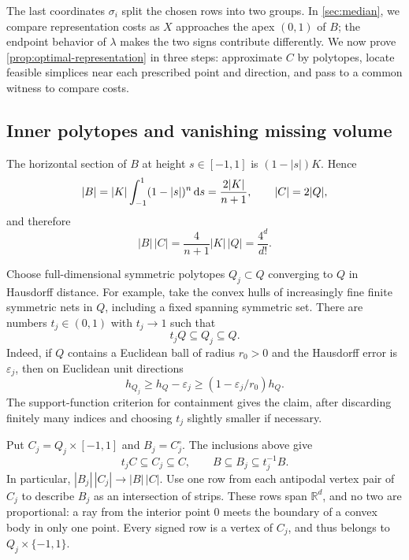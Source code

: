 The last coordinates $\sigma_i$ split the chosen rows into two groups. In \cref{sec:median}, we compare representation costs as $X$ approaches the apex $(0,1)$ of $B$; the endpoint behavior of $\lambda$ makes the two signs contribute differently. We now prove \cref{prop:optimal-representation} in three steps: approximate $C$ by polytopes, locate feasible simplices near each prescribed point and direction, and pass to a common witness to compare costs.

\subsection{Inner polytopes and vanishing missing volume}

The horizontal section of $B$ at height $s\in[-1,1]$ is $(1-|s|)K$. Hence
\[
 |B|=|K|\int_{-1}^1(1-|s|)^n\,\mathrm{d} s
     =\frac{2|K|}{n+1},
 \qquad |C|=2|Q|,
\]
and therefore
\begin{equation}\label{eq:lift-equality}
 |B|\,|C|=\frac4{n+1}|K|\,|Q|=\frac{4^d}{d!}.
\end{equation}

Choose full-dimensional symmetric polytopes $Q_j\subset Q$ converging to $Q$ in Hausdorff distance. For example, take the convex hulls of increasingly fine finite symmetric nets in $Q$, including a fixed spanning symmetric set. There are numbers $t_j\in(0,1)$ with $t_j\to1$ such that
\[
 t_jQ\subseteq Q_j\subseteq Q.
\]
Indeed, if $Q$ contains a Euclidean ball of radius $r_0>0$ and the Hausdorff error is $\varepsilon_j$, then on Euclidean unit directions
\[
 h_{Q_j}\ge h_Q-\varepsilon_j
          \ge (1-\varepsilon_j/r_0)h_Q.
\]
The support-function criterion for containment gives the claim, after discarding finitely many indices and choosing $t_j$ slightly smaller if necessary.

Put $C_j=Q_j\times[-1,1]$ and $B_j=C_j^\circ$. The inclusions above give
\begin{equation}\label{eq:lift-sandwich}
 t_jC\subseteq C_j\subseteq C,
 \qquad
 B\subseteq B_j\subseteq t_j^{-1}B.
\end{equation}
In particular, $|B_j|\,|C_j|\to|B|\,|C|$. Use one row from each antipodal vertex pair of $C_j$ to describe $B_j$ as an intersection of strips. These rows span $\mathbb{R}^d$, and no two are proportional: a ray from the interior point $0$ meets the boundary of a convex body in only one point. Every signed row is a vertex of $C_j$, and thus belongs to $Q_j\times\{-1,1\}$.

